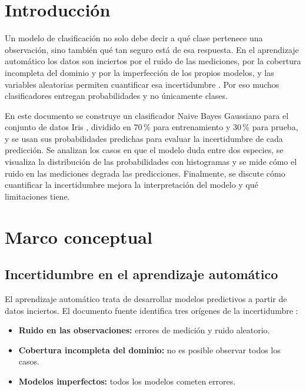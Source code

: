 \documentclass[11pt,letterpaper]{article}
\begin{document}
\portada
\indicegeneral


\section{Introducción}

Un modelo de clasificación no solo debe decir a qué clase pertenece una observación, sino también qué tan seguro está de esa respuesta. En el aprendizaje automático los datos son inciertos por el ruido de las mediciones, por la cobertura incompleta del dominio y por la imperfección de los propios modelos, y las variables aleatorias permiten cuantificar esa incertidumbre \parencite{tecnm2026_documento_fuente,brownlee2020}. Por eso muchos clasificadores entregan probabilidades y no únicamente clases.

En este documento se construye un clasificador Naive Bayes Gaussiano para el conjunto de datos Iris \parencite{fisher1936}, dividido en 70\,\% para entrenamiento y 30\,\% para prueba, y se usan sus probabilidades predichas para evaluar la incertidumbre de cada predicción. Se analizan los casos en que el modelo duda entre dos especies, se visualiza la distribución de las probabilidades con histogramas y se mide cómo el ruido en las mediciones degrada las predicciones. Finalmente, se discute cómo cuantificar la incertidumbre mejora la interpretación del modelo y qué limitaciones tiene.

\section{Marco conceptual}

\subsection{Incertidumbre en el aprendizaje automático}

El aprendizaje automático trata de desarrollar modelos predictivos a partir de datos inciertos. El documento fuente identifica tres orígenes de la incertidumbre \parencite{tecnm2026_documento_fuente}:

\begin{itemize}
    \item \textbf{Ruido en las observaciones:} errores de medición y ruido aleatorio.
    \item \textbf{Cobertura incompleta del dominio:} no es posible observar todos los casos.
    \item \textbf{Modelos imperfectos:} todos los modelos cometen errores.
\end{itemize}
\end{document}
